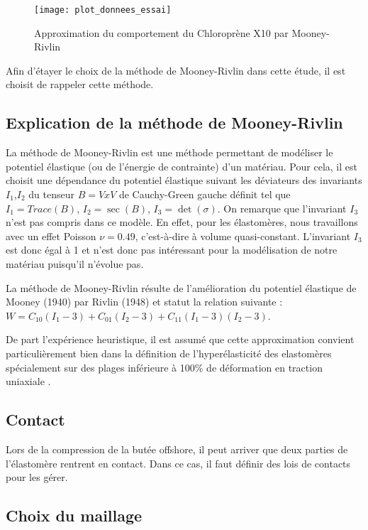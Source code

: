﻿ \documentclass{article}
\begin{document}
\begin{figure}
\texttt{[image: plot\_donnees\_essai]}
\caption{Approximation du comportement du Chloroprène X10 par Mooney-Rivlin}
\label{fig:plot_donnees_essais}
\end{figure}

Afin d'étayer le choix de la méthode de Mooney-Rivlin dans cette étude, il est choisit de rappeler cette méthode.

\subsection{Explication de la méthode de Mooney-Rivlin}
La méthode de Mooney-Rivlin est une méthode permettant de modéliser le potentiel élastique (ou de l'énergie de contrainte) d'un matériau. Pour cela, il est choisit une dépendance du potentiel élastique suivant les déviateurs des invariants $I_1$,$I_2$ du tenseur $B = V x V$ de Cauchy-Green gauche définit tel que $I_1 = Trace(B)$, $I_2 = \sec(B)$, $I_3=\det(\sigma)$.
On remarque que l'invariant $I_3$ n'est pas compris dans ce modèle. En effet, pour les élastomères, nous travaillons avec un effet Poisson $\nu = 0.49$, c'est-à-dire à volume quasi-constant. L'invariant $I_3$ est donc égal à 1 et n'est donc pas intéressant pour la modélisation de notre matériau puisqu'il n'évolue pas.

La méthode de Mooney-Rivlin résulte de l'amélioration du potentiel élastique de Mooney (1940) par Rivlin (1948) et statut la relation suivante \cite{wiki_MR}: $W = C_10(I_1-3) + C_01(I_2-3) + C_11(I_1-3)(I_2-3)$.

De part l'expérience heuristique, il est assumé que cette approximation convient particulièrement bien dans la définition de l'hyperélasticité des elastomères spécialement sur des plages inférieure à 100\% de déformation en traction uniaxiale \cite{msc}.

\subsection{Contact}
Lors de la compression de la butée offshore, il peut arriver que deux parties de l'élastomère rentrent en contact. Dans ce cas, il faut définir des lois de contacts pour les gérer. 

\subsection{Choix du maillage}
\end{document}
